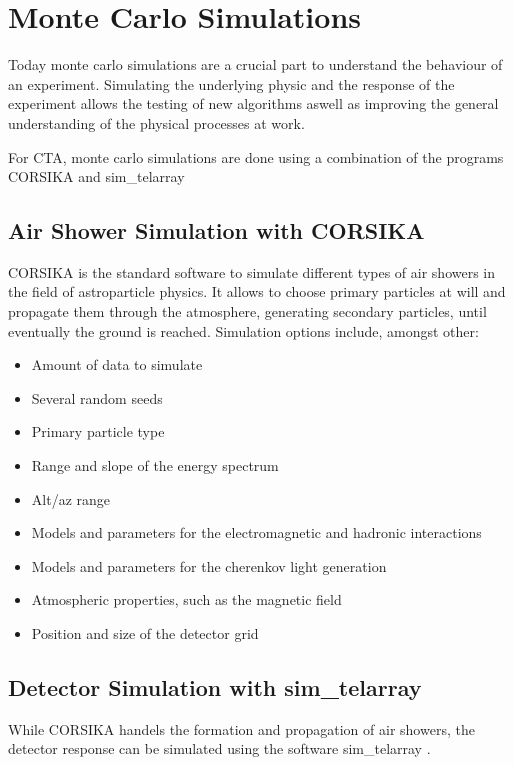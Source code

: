 \section{Monte Carlo Simulations}
Today monte carlo simulations are a crucial part to 
understand the behaviour of an experiment. 
Simulating the underlying physic and the response of the experiment
allows the testing of new algorithms aswell as improving the general understanding
of the physical processes at work. 

For CTA, monte carlo simulations are done using a combination of the
programs CORSIKA and sim\_telarray

\subsection{Air Shower Simulation with CORSIKA}
CORSIKA \cite{heck1998corsika} is the standard software to simulate different types of
air showers in the field of astroparticle physics.
It allows to choose primary particles at will and
propagate them through the atmosphere, generating secondary particles, until
eventually the ground is reached.
Simulation options include, amongst other:
\begin{itemize}
  \item Amount of data to simulate
  \item Several random seeds
  \item Primary particle type
  \item Range and slope of the energy spectrum
  \item Alt/az range
  \item Models and parameters for the electromagnetic and hadronic interactions
  \item Models and parameters for the cherenkov light generation
  \item Atmospheric properties, such as the magnetic field
  \item Position and size of the detector grid
\end{itemize}

\subsection{Detector Simulation with sim\_telarray}
While CORSIKA handels the formation and propagation of air showers,
the detector response can be simulated using the software
sim\_telarray \cite{BERNLOHR2008149}.

